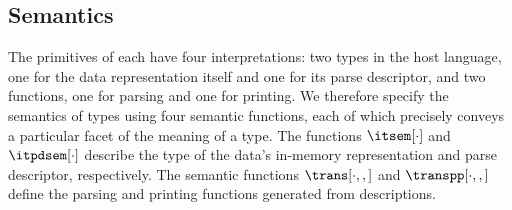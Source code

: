 \subsection{\ddc{} Semantics}
\label{sec:ddc-sem}

The primitives of \ddc{} each have four interpretations: two
types in the host language, one for the data representation
itself and one for its parse descriptor, and two functions,
one for parsing and one for printing.
We therefore specify the semantics of \ddc{} types using four semantic
functions, each of which precisely conveys a particular facet of the
meaning of a type.  The functions $\itsem[\cdot]$ and $\itpdsem[\cdot]$
describe the type of the data's in-memory representation and 
parse descriptor, respectively. The semantic
functions $\trans[\cdot,,]$ and $\transpp[\cdot,,]$ define
the parsing and printing functions generated from \ddc{} descriptions.


